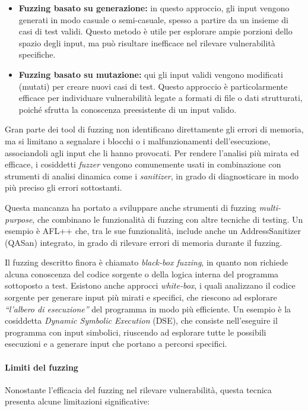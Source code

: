 \begin{itemize}
  \item \textbf{Fuzzing basato su generazione:} in questo approccio, gli input vengono
    generati in modo casuale o semi-casuale, spesso a partire da un insieme di
    casi di test validi. Questo metodo è utile per esplorare ampie porzioni dello
    spazio degli input, ma può risultare inefficace nel rilevare vulnerabilità
    specifiche.

  \item \textbf{Fuzzing basato su mutazione:} qui gli input validi vengono
    modificati (mutati) per creare nuovi casi di test. Questo approccio è particolarmente
    efficace per individuare vulnerabilità legate a formati di file o dati strutturati,
    poiché sfrutta la conoscenza preesistente di un input valido.
\end{itemize}

Gran parte dei tool di fuzzing non identificano direttamente gli errori di
memoria, ma si limitano a segnalare i blocchi o i malfunzionamenti dell'esecuzione,
associandoli agli input che li hanno provocati. Per rendere l'analisi più mirata
ed efficace, i cosiddetti \textit{fuzzer} vengono comunemente usati in combinazione
con strumenti di analisi dinamica come i \textit{sanitizer}, in grado di diagnosticare
in modo più preciso gli errori sottostanti.

Questa mancanza ha portato a sviluppare anche strumenti di fuzzing \textit{multi-purpose},
che combinano le funzionalità di fuzzing con altre tecniche di testing. Un
esempio è AFL++\cite{afl_plus_plus} che, tra le sue funzionalità, include anche un
AddressSanitizer (QASan\cite{qasan}) integrato, in grado di rilevare errori di memoria
durante il fuzzing.

Il fuzzing descritto finora è chiamato \textit{black-box fuzzing}, in quanto non
richiede alcuna conoscenza del codice sorgente o della logica interna del programma
sottoposto a test. Esistono anche approcci \textit{white-box}, i quali
analizzano il codice sorgente per generare input più mirati e specifici, che riescono
ad esplorare \textit{``l'albero di esecuzione''} del programma in modo più
efficiente. Un esempio è la cosiddetta \textit{Dynamic Symbolic Execution} (DSE),
che consiste nell'eseguire il programma con input simbolici, riuscendo ad
esplorare tutte le possibili esecuzioni e a generare input che portano a
percorsi specifici.

\paragraph{Limiti del fuzzing}
Nonostante l'efficacia del fuzzing nel rilevare vulnerabilità, questa tecnica
presenta alcune limitazioni significative:

